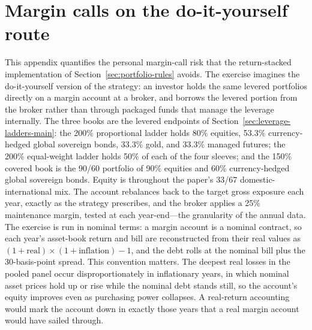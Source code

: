 \documentclass[11pt]{article}
\begin{document}
\section{Margin calls on the do-it-yourself route}
\label{app:margin-call}

This appendix quantifies the personal margin-call risk that the return-stacked
implementation of Section~\ref{sec:portfolio-rules} avoids. The exercise
imagines the do-it-yourself version of the strategy: an investor holds the
same levered portfolios directly on a margin account at a broker, and borrows
the levered portion from the broker rather than through packaged funds that
manage the leverage internally. The three books are the levered endpoints of
Section~\ref{sec:leverage-ladders-main}: the 200\% proportional ladder holds
80\% equities, 53.3\% currency-hedged global sovereign bonds, 33.3\% gold, and
33.3\% managed futures; the 200\% equal-weight ladder holds 50\% of each of
the four sleeves; and the 150\% covered book is the 90/60 portfolio of 90\%
equities and 60\% currency-hedged global sovereign bonds. Equity is
throughout the paper's 33/67 domestic-international mix. The account
rebalances back to the target
gross exposure each year, exactly as the strategy prescribes, and the broker
applies a 25\% maintenance margin, tested at each year-end---the granularity
of the annual data. The exercise is run in nominal terms: a margin account is a
nominal contract, so each year's asset-book return and bill are reconstructed
from their real values as $(1+\text{real})\times(1+\text{inflation})-1$, and
the debt rolls at the nominal bill plus the 30-basis-point spread. This
convention matters. The deepest real losses in the pooled panel occur
disproportionately in inflationary years, in which nominal asset prices hold
up or rise while the nominal debt stands still, so the account's equity
improves even as purchasing power collapses. A real-return accounting would
mark the account down in exactly those years that a real margin account would
have sailed through.
\end{document}
